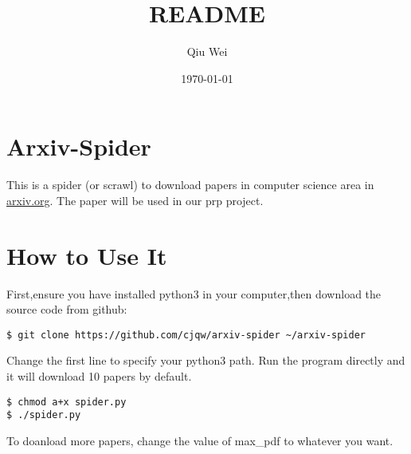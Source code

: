 \documentclass[11pt]{article}
\author{Qiu Wei}
\date{\today}
\title{README}
\begin{document}
\maketitle
\tableofcontents

\section{Arxiv-Spider}
\label{sec-1}
This is a spider (or scrawl) to download papers in computer science area in \href{http://arxiv.org/}{arxiv.org}.
The paper will be used in our prp project.
\section{How to Use It}
\label{sec-2}
First,ensure you have installed python3 in your computer,then download the source code
from github:
\begin{verbatim}
$ git clone https://github.com/cjqw/arxiv-spider ~/arxiv-spider
\end{verbatim}
Change the first line to specify your python3 path.
Run the program directly and it will download 10 papers by default.
\begin{verbatim}
$ chmod a+x spider.py
$ ./spider.py
\end{verbatim}
To doanload more papers, change the value of max\_pdf to whatever you want.
\end{document}
